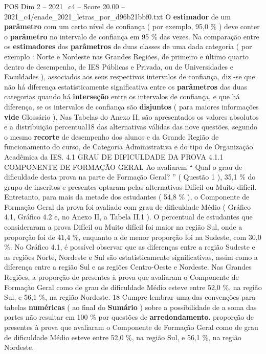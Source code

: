 \begin{textsample}{POS Dim 2 – 2021\_c4 – Score 20.00 – 2021\_c4/enade\_2021\_letras\_por\_d96b21bbf0.txt}
O \textbf{estimador} de um \textbf{parâmetro} com um certo nível de confiança ( por exemplo, 95,0 \% ) deve conter o \textbf{parâmetro} no intervalo de confiança em 95 \% das vezes.
Na comparação entre os \textbf{estimadores} dos \textbf{parâmetros} de duas classes de uma dada categoria ( por exemplo : Norte e Nordeste nas Grandes Regiões, de primeiro e último quarto dentro de desempenho, de IES Públicas e Privada, ou de Universidades e Faculdades ), associados aos seus respectivos intervalos de confiança, diz -se que não há diferença estatisticamente significativa entre os \textbf{parâmetros} das duas categorias quando há \textbf{interseção} entre os intervalos de confiança, e que há diferença, se os intervalos de confiança são \textbf{disjuntos} ( para maiores informações \textbf{vide} Glossário ).
Nas Tabelas do Anexo II, são apresentados os valores absolutos e a distribuição percentual18 das alternativas válidas das nove questões, segundo o mesmo \textbf{recorte} de desempenho dos alunos e da Grande Região de funcionamento do curso, de Categoria Administrativa e do tipo de Organização Acadêmica da IES. 4.1 GRAU DE DIFICULDADE DA PROVA 4.1.1 COMPONENTE DE FORMAÇÃO GERAL Ao avaliarem “ Qual o grau de dificuldade desta prova na parte de Formação Geral? ” ( Questão 1 ), 35,1 \% do grupo de inscritos e presentes optaram pelas alternativas Difícil ou Muito difícil.
Entretanto, para mais da metade dos estudantes ( 54,8 \% ), o Componente de Formação Geral da prova foi avaliado com grau de dificuldade Médio ( Gráfico 4.1, Gráfico 4.2 e, no Anexo II, a Tabela II.1 ).
O percentual de estudantes que consideraram a prova Difícil ou Muito difícil foi maior na região Sul, onde a proporção foi de 41,4 \%, enquanto a de menor proporção foi na Sudeste, com 30,0 \%.
No Gráfico 4.1, é possível observar que as diferenças entre a região Sudeste e as regiões Norte, Nordeste e Sul são estatisticamente significativas, assim como a diferença entre a região Sul e as regiões Centro-Oeste e Nordeste.
Nas Grandes Regiões, a proporção de presentes à prova que avaliaram o Componente de Formação Geral como de grau de dificuldade Médio esteve entre 52,0 \%, na região Sul, e 56,1 \%, na região Nordeste. 18 Cumpre lembrar uma das convenções para tabelas \textbf{numéricas} ( ao final do \textbf{Sumário} ) sobre a possibilidade de a soma das partes não resultar em 100 \% por questões de \textbf{arredondamento}. proporção de presentes à prova que avaliaram o Componente de Formação Geral como de grau de dificuldade Médio esteve entre 52,0 \%, na região Sul, e 56,1 \%, na região Nordeste.

\end{textsample}
